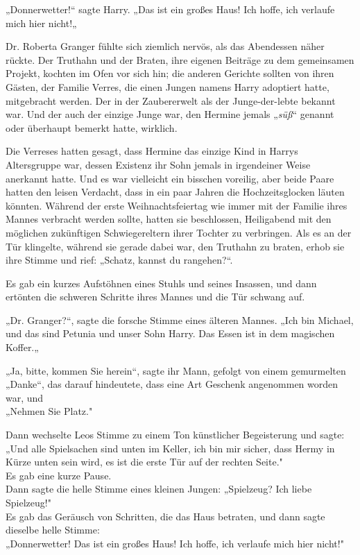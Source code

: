 {„Donnerwetter!“ sagte Harry. „Das ist ein großes Haus! Ich hoffe, ich verlaufe mich hier nicht!„

Dr. Roberta Granger fühlte sich ziemlich nervös, als das Abendessen näher rückte. Der Truthahn und der Braten, ihre eigenen Beiträge zu dem gemeinsamen Projekt, kochten im Ofen vor sich hin; die anderen Gerichte sollten von ihren Gästen, der Familie Verres, die einen Jungen namens Harry adoptiert hatte, mitgebracht werden. Der in der Zaubererwelt als der Junge-der-lebte bekannt war. Und der auch der einzige Junge war, den Hermine jemals „\emph{süß}“ genannt oder überhaupt bemerkt hatte, wirklich.

Die Verreses hatten gesagt, dass Hermine das einzige Kind in Harrys Altersgruppe war, dessen Existenz ihr Sohn jemals in irgendeiner Weise anerkannt hatte. Und es war vielleicht ein bisschen voreilig, aber beide Paare hatten den leisen Verdacht, dass in ein paar Jahren die Hochzeitsglocken läuten könnten. Während der erste Weihnachtsfeiertag wie immer mit der Familie ihres Mannes verbracht werden sollte, hatten sie beschlossen, Heiligabend mit den möglichen zukünftigen Schwiegereltern ihrer Tochter zu verbringen. Als es an der Tür klingelte, während sie gerade dabei war, den Truthahn zu braten, erhob sie ihre Stimme und rief: „Schatz, kannst du rangehen?“.

Es gab ein kurzes Aufstöhnen eines Stuhls und seines Insassen, und dann ertönten die schweren Schritte ihres Mannes und die Tür schwang auf.

„Dr. Granger?“, sagte die forsche Stimme eines älteren Mannes. „Ich bin Michael, und das sind Petunia und unser Sohn Harry. Das Essen ist in dem magischen Koffer.„

„Ja, bitte, kommen Sie herein“, sagte ihr Mann, gefolgt von einem gemurmelten\\ „Danke“, das darauf hindeutete, dass eine Art Geschenk angenommen worden war, und\\ „Nehmen Sie Platz."

Dann wechselte Leos Stimme zu einem Ton künstlicher Begeisterung und sagte:\\ „Und alle Spielsachen sind unten im Keller, ich bin mir sicher, dass Hermy in Kürze unten sein wird, es ist die erste Tür auf der rechten Seite."\\ Es gab eine kurze Pause.\\ Dann sagte die helle Stimme eines kleinen Jungen: „Spielzeug? Ich liebe Spielzeug!"\\ Es gab das Geräusch von Schritten, die das Haus betraten, und dann sagte dieselbe helle Stimme:\\ „Donnerwetter! Das ist ein großes Haus! Ich hoffe, ich verlaufe mich hier nicht!"

}
